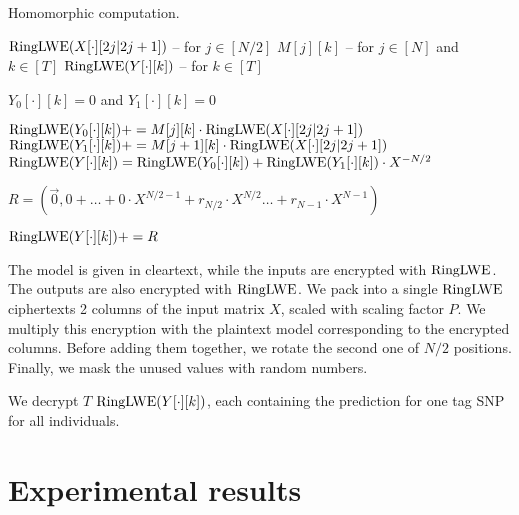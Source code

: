 \documentclass[a4paper]{article}
\newcommand{\RingLWE}{\sc{\mathrm{RingLWE}}}
\begin{document}
\begin{algorithm}
\caption{Homomorphic computation.}
\begin{algorithmic}[1]
    \Require $\RingLWE(X[\cdot][2j|2j+1])$ -- for $j \in [N/2]$ \label{algline:X}
    \Require $M[j][k]$ -- for $j\in [N]$ and $k\in [T]$ \label{algline:M}
    \Ensure $\RingLWE(Y[\cdot][k])$ -- for $k\in [T]$ \label{algline:Y}
    
    \Statex
    
    \State $Y_0[\cdot][k] = 0$ and $Y_1[\cdot][k] = 0$ \label{algline:init}
    
     \label{algline:for_k} 
    	 \label{algline:for_j} 
    			\State $\RingLWE(Y_0[\cdot][k]) += M[j][k] \cdot \RingLWE(X[\cdot][2j|2j+1])$ \label{algline:Y_0}
    		\EndIf
    			\State $\RingLWE(Y_1[\cdot][k]) += M[j+1][k] \cdot \RingLWE(X[\cdot][2j|2j+1])$ \label{algline:Y_0}
    		\EndIf
    	\EndFor
    	\State $\RingLWE(Y[\cdot][k]) = \RingLWE(Y_0[\cdot][k]) + \RingLWE(Y_1[\cdot][k]) \cdot X^{-N/2}$ 
    \EndFor
    
    \State $R = (\vec{0}, 0 + \ldots + 0 \cdot X^{N/2-1} + r_{N/2} \cdot X^{N/2} \ldots + r_{N-1} \cdot X^{N-1})$ 
    
    \State $\RingLWE(Y[\cdot][k]) += R$ 
    
\end{algorithmic}\label{alg:computation}
\end{algorithm}



The model is given in cleartext, while the inputs are encrypted with $\RingLWE$. 
The outputs are also encrypted with $\RingLWE$.
We pack into a single $\RingLWE$ ciphertexts 2 columns of the input matrix $X$, scaled with scaling factor $P$.
We multiply this encryption with the plaintext model corresponding to the encrypted columns. 
Before adding them together, we rotate the second one of $N/2$ positions.
Finally, we mask the unused values with random numbers. 

We decrypt $T$ $\RingLWE(Y[\cdot][k])$, each containing the prediction for one tag SNP for all individuals.






\section{Experimental results}
\end{document}
